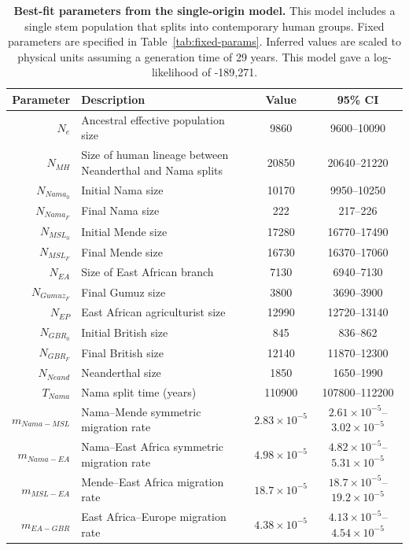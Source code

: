 \documentclass[]{article}
\begin{document}
\begin{table}[ht]
\caption{
    \label{tab:supp-single-origin}
    \textbf{Best-fit parameters from the single-origin model.}
    This model includes a single stem population that splits into contemporary human
    groups. Fixed parameters are specified in Table~\ref{tab:fixed-params}.
    Inferred values are scaled to physical units assuming a generation time of
    29 years. This model gave a log-likelihood of -189,271.
}
\centering
\begin{tabular}[t]{rP{8cm}cc}
    \toprule
    Parameter & Description & Value & 95\% CI \\
    \midrule
    $N_e$ & Ancestral effective population size & 9860 & 9600--10090 \\
    $N_{MH}$ & Size of human lineage between Neanderthal and Nama splits & 20850 & 20640--21220 \\
    $N_{Nama_0}$ & Initial Nama size & 10170 & 9950--10250 \\
    $N_{Nama_F}$ & Final Nama size & 222 & 217--226 \\
    $N_{MSL_0}$ & Initial Mende size & 17280 & 16770--17490 \\
    $N_{MSL_F}$ & Final Mende size & 16730 & 16370--17060 \\
    $N_{EA}$ & Size of East African branch & 7130 & 6940--7130 \\
    $N_{Gumuz_F}$ & Final Gumuz size & 3800 & 3690--3900 \\
    $N_{EP}$ & East African agriculturist size & 12990 & 12720--13140 \\
    $N_{GBR_0}$ & Initial British size & 845 & 836--862 \\
    $N_{GBR_F}$ & Final British size & 12140 & 11870--12300 \\
    $N_{Neand}$ & Neanderthal size & 1850 & 1650--1990 \\
    $T_{Nama}$ & Nama split time (years) & 110900 & 107800--112200 \\
    $m_{Nama-MSL}$ & Nama--Mende symmetric migration rate & $2.83\times10^{-5}$ & $2.61\times10^{-5}$--$3.02\times10^{-5}$ \\
    $m_{Nama-EA}$ & Nama--East Africa symmetric migration rate & $4.98\times10^{-5}$ & $4.82\times10^{-5}$--$5.31\times10^{-5}$ \\
    $m_{MSL-EA}$ & Mende--East Africa migration rate & $18.7\times10^{-5}$ & $18.7\times10^{-5}$--$19.2\times10^{-5}$ \\
    $m_{EA-GBR}$ & East Africa--Europe migration rate & $4.38\times10^{-5}$ & $4.13\times10^{-5}$--$4.54\times10^{-5}$ \\

\end{tabular}
\end{table}
\end{document}

